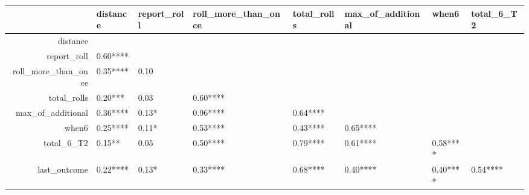 \begin{table}[ht]
\centering
\begin{tabular}{rlllllll}
  \hline
 & distance & report\_roll & roll\_more\_than\_once & total\_rolls & max\_of\_additional & when6 & total\_6\_T2 \\ 
  \hline
distance &  &  &  &  &  &  &  \\ 
  report\_roll &  0.60**** &  &  &  &  &  &  \\ 
  roll\_more\_than\_once &  0.35**** &  0.10     &  &  &  &  &  \\ 
  total\_rolls &  0.20***  &  0.03     &  0.60**** &  &  &  &  \\ 
  max\_of\_additional &  0.36**** &  0.13*    &  0.96**** &  0.64**** &  &  &  \\ 
  when6 &  0.25**** &  0.11*    &  0.53**** &  0.43**** &  0.65**** &  &  \\ 
  total\_6\_T2 &  0.15**   &  0.05     &  0.50**** &  0.79**** &  0.61**** &  0.58**** &  \\ 
  last\_outcome &  0.22**** &  0.13*    &  0.33**** &  0.68**** &  0.40**** &  0.40**** &  0.54**** \\ 
   \hline
\end{tabular}
\end{table}
